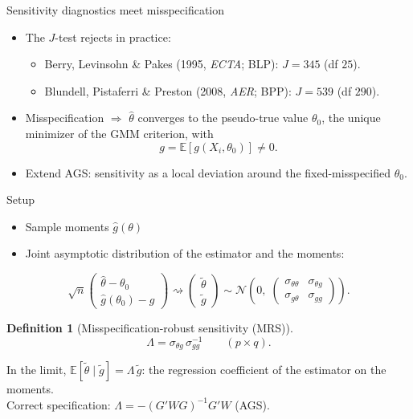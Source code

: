 \documentclass[11pt,aspectratio=169]{beamer}
\newtheorem{defn}{Definition}
\newcommand{\E}{\mathbb{E}}
\begin{document}
\begin{frame}{Sensitivity diagnostics meet misspecification}
    \begin{itemize}\setlength{\itemsep}{0.9em}
        \item The $J$-test rejects in practice:
              \begin{itemize}\small\setlength{\itemsep}{0.25em}
                  \item Berry, Levinsohn \& Pakes (1995, \textit{ECTA}; BLP):
                        $J=345$ (df $25$).
                  \item Blundell, Pistaferri \& Preston (2008, \textit{AER}; BPP):
                        $J=539$ (df $290$).
              \end{itemize}
        \item Misspecification $\Rightarrow$ $\widehat\theta$ converges to the
              pseudo-true value $\theta_0$, the unique minimizer of the GMM
              criterion, with
              \[
                  g=\E[g(X_i,\theta_0)]\neq 0.
              \]
        \item \alert{Extend AGS: sensitivity as a local deviation around the
              fixed-misspecified $\theta_0$.}
    \end{itemize}
\end{frame}

\begin{frame}{Setup}
    \begin{itemize}\setlength{\itemsep}{0.7em}
        \item Sample moments $\widehat{g}(\theta)$
        \item Joint asymptotic distribution of the estimator and the moments:
    \end{itemize}
    \[
        \sqrt n
        \begin{pmatrix}\widehat\theta-\theta_0\\ \widehat g(\theta_0)-g\end{pmatrix}
        \rightsquigarrow
        \begin{pmatrix}\widetilde\theta\\ \widetilde g\end{pmatrix}
        \sim
        \mathcal N\!\left(0,\;
        \begin{pmatrix}\sigma_{\theta\theta} & \sigma_{\theta g}\\
                       \sigma_{g\theta} & \sigma_{gg}\end{pmatrix}\right).
    \]
    \begin{defn}[Misspecification-robust sensitivity (MRS)]
        \[
            \Lambda=\sigma_{\theta g}\,\sigma_{gg}^{-1}\qquad(p\times q).
        \]
    \end{defn}
    In the limit, $\E[\widetilde\theta\mid\widetilde g]=\Lambda\,\widetilde g$:
    the regression coefficient of the estimator on the moments.
    \\[0.5em]
    Correct specification: \quad $\Lambda=-(G'WG)^{-1}G'W$ (AGS).
\end{frame}
\end{document}
